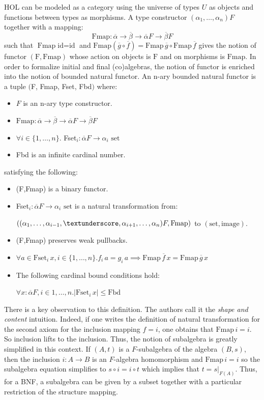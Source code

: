 \documentclass[notitlepage]{article}
\begin{document}
HOL can be modeled as a category using the universe of types $U$ as objects and functions between types as morphisms. A type constructor $(\alpha_1,\ldots,\alpha_n)F$ together with a mapping: \[\text{Fmap}: \overline{\alpha} \to \overline{\beta} \to \overline{\alpha} F \to \overline{\beta} F\] such that $\text{Fmap} \; \text{id} = \text{id}$ and $\text{Fmap} (\overline{g} \circ \overline{f}) = \text{Fmap} \, \overline{g} \circ \text{Fmap} \, \overline{f}$ gives the notion of functor $(\text{F}, \text{Fmap})$ whose action on objects is $\text{F}$ and on morphisms is $\text{Fmap}$. In order to formalize initial and final (co)algebras, the notion of functor is enriched into the notion of bounded natural functor. An n-ary bounded natural functor is a tuple $($F, Fmap, Fset, Fbd$)$ where:

\begin{itemize}
	\item $F$ is an n-ary type constructor.
	\item $\text{Fmap}: \overline{\alpha} \to \overline{\beta} \to \overline{\alpha} F \to \overline{\beta} F$
	\item $\forall i \in \{1,\ldots,n\}.$ Fset$_i: \overline{\alpha}F \to \alpha_i \text{ set}$
	\item Fbd is an infinite cardinal number.
\end{itemize}

satisfying the following:

\begin{itemize}
	\item (F,Fmap) is a binary functor.
	\item Fset$_i: \overline{\alpha}F \to \alpha_i \text{ set}$ is a natural transformation from:
	
	$((\alpha_1,\ldots,\alpha_{i-1},\textunderscore,\alpha_{i+1},\ldots,\alpha_n)F, \text{Fmap})$ to $(\text{set}, \text{image})$.
	\item (F,Fmap) preserves weak pullbacks.
	\item $\forall a \in \text{Fset}_i \, x,  i \in \{1,\ldots,n\}. f_i \, a = g_i \, a \implies \text{Fmap} \, \overline{f} \, x = \text{Fmap} \, \overline{g} \, x$
	\item The following cardinal bound conditions hold:
	
	$\forall x : \overline{\alpha} F, i \in {1,\ldots,n}. |\text{Fset}_i \, x | \le \text{Fbd}$
\end{itemize}

There is a key observation to this definition. The authors call it the \textit{shape and content} intuition. Indeed, if one writes the definition of natural transformation for the second axiom for the inclusion mapping $f = i$, one obtains that $\text{Fmap} \, i = i$. So inclusion lifts to the inclusion. Thus, the notion of subalgebra is greatly simplified in this context. If $(A,t)$ is a $F$-subalgebra of the algebra $(B,s)$, then the inclusion $i: A \to B$ is an $F$-algebra homomorphism and $\text{Fmap} \, i = i$ so the subalgebra equation simplifies to $s \circ i = i \circ t$ which implies that $t = s|_{F(A)}$. Thus, for a BNF, a subalgebra can be given by a subset together with a particular restriction of the structure mapping.
\end{document}
